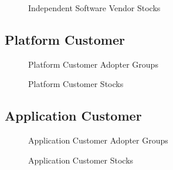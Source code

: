 	\begin{figure}[htb]
		\centering
		
		\caption{Independent Software Vendor Stocks}
	\end{figure}

	\newpage
	\subsection{Platform Customer}\label{ch:app05:cs:pc}
	
	\begin{figure}[htb]
		\centering
		
		\caption{Platform Customer Adopter Groups}
	\end{figure}

	\begin{figure}[htb]
		\centering
		
		\caption{Platform Customer Stocks}
	\end{figure}

	\newpage
	\subsection{Application Customer}\label{ch:app05:cs:ac}
	
	\begin{figure}[htb]
		\centering
		
		\caption{Application Customer Adopter Groups}
	\end{figure}

	\begin{figure}[htb]
		\centering
		
		\caption{Application Customer Stocks}
	\end{figure}